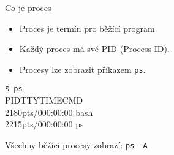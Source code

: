 \documentclass{beamer}
\begin{document}
\begin{frame}[fragile]{Co je proces}
	\begin{itemize}
		\item Proces je termín pro běžící program
		\item Každý proces má své PID (Process ID).
		\item Procesy lze zobrazit příkazem \texttt{ps}.
	\end{itemize}
	\vspace{0.5em}
	\hspace{2em}\texttt{\$ ps} \\
	\hspace{2em}PID\hspace{3em}TTY\hspace{2em}TIME\hspace{2em}CMD \\
	\hspace{2em}2180\hspace{2em}pts/0\hspace{1em}00:00:00 bash \\
	\hspace{2em}2215\hspace{2em}pts/0\hspace{1em}00:00:00 ps
	
	\vspace{2.5em}	
	\hspace{2em}Všechny běžící procesy zobrazí: \texttt{ps -A}
\end{frame}
\end{document}
